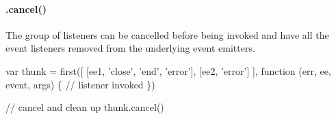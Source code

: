 \paragraph*{.cancel()}

The group of listeners can be cancelled before being invoked and have all the event listeners removed from the underlying event emitters.


\begin{DoxyCode}
var thunk = first([
  [ee1, 'close', 'end', 'error'],
  [ee2, 'error']
], function (err, ee, event, args) \{
  // listener invoked
\})

// cancel and clean up
thunk.cancel()
\end{DoxyCode}
 